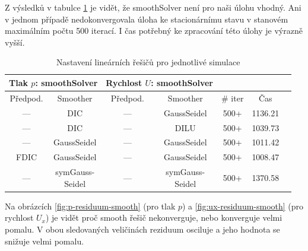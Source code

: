 \documentclass[a4paper,12pt]{report}
\theoremstyle{remark}
\begin{document}
Z výsledků v tabulce \ref{table:solvers_smooth} je vidět, že smoothSolver není pro naši úlohu vhodný. Ani v jednom případě nedokonvergovala úloha ke stacionárnímu stavu v stanovém maximálním počtu 500 iterací.  I čas potřebný ke zpracování této úlohy je výrazně vyšší. 

 \begin{table}[H]
	\centering
	\caption{Nastavení lineárních řešičů pro jednotlivé simulace}
	\renewcommand{\arraystretch}{1.9}
	\begin{tabular}{*7c}
		\toprule
\multicolumn{2}{c}{Tlak $p$: \textbf{smoothSolver}} & \multicolumn{2}{c}{Rychlost $U$: \textbf{smoothSolver}}\\
\midrule
Předpod.&Smoother&Předpod.&Smoother&\# iter&Čas\\
\midrule		
 --- & DIC &  --- & GaussSeidel &500+&1136.21\\	
 --- & DIC & --- & DILU &500+&1039.73\\
 --- & GaussSeidel &   --- & GaussSeidel &500+&1011.42\\		
 FDIC & GaussSeidel &  --- & GaussSeidel &500+&1008.47\\
 --- & \shortstack{symGauss-\\Seidel} &  --- & \shortstack{symGauss-\\Seidel}&500+&1370.58\\	
\bottomrule
\end{tabular}
	
	\label{table:solvers_smooth}
\end{table}

Na obrázcích \ref{fig:p-residuum-smooth} (pro tlak $p$) a \ref{fig:ux-residuum-smooth} (pro rychlost $U_x$) je vidět proč smooth řešič nekonverguje, nebo konverguje velmi pomalu. V obou sledovaných veličinách reziduum osciluje a jeho hodnota se snižuje velmi pomalu.
\end{document}
